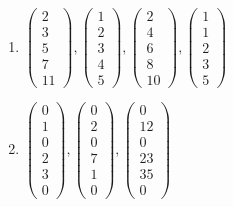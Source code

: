 \begin{enumerate}
\item
$\left( \begin{array}{c} 2 \\ 3 \\ 5 \\ 7 \\ 11 \end{array} \right) ,
\left( \begin{array}{c} 1 \\ 2 \\ 3 \\ 4 \\5 \end{array} \right) , 
\left( \begin{array}{c} 2 \\ 4 \\ 6 \\ 8 \\ 10 \end{array} \right) , 
\left( \begin{array}{c} 1 \\ 1 \\ 2 \\ 3 \\ 5 \end{array} \right) $

\item
$\left( \begin{array}{c} 0 \\ 1 \\ 0\\ 2 \\ 3 \\ 0 \end{array} \right) , 
\left( \begin{array}{c} 0 \\ 2 \\ 0\\ 7 \\ 1 \\ 0 \end{array} \right) , 
\left( \begin{array}{c} 0 \\ 12 \\ 0\\ 23 \\ 35 \\ 0 \end{array} \right) $



\end{enumerate}

